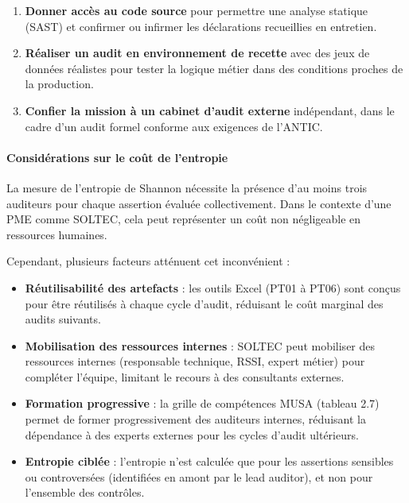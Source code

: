 \documentclass[12pt,a4paper,oneside]{report}
\begin{document}
\begin{enumerate}[label={\color{gold}\theenumi.}, leftmargin=*]
	\item \textbf{Donner accès au code source} pour permettre une 
	analyse statique (SAST) et confirmer ou infirmer les déclarations 
	recueillies en entretien.
	
	\item \textbf{Réaliser un audit en environnement de recette} 
	avec des jeux de données réalistes pour tester la logique métier 
	dans des conditions proches de la production.
	
	\item \textbf{Confier la mission à un cabinet d'audit externe} 
	indépendant, dans le cadre d'un audit formel conforme aux exigences 
	de l'ANTIC.
\end{enumerate}
\paragraph{Considérations sur le coût de l'entropie}

La mesure de l'entropie de Shannon nécessite la présence d'au moins 
trois auditeurs pour chaque assertion évaluée collectivement. Dans 
le contexte d'une PME comme SOLTEC, cela peut représenter un coût 
non négligeable en ressources humaines.

Cependant, plusieurs facteurs atténuent cet inconvénient :

\begin{itemize}[label={\color{gold}}, leftmargin=*, itemsep=2pt]
	\item \textbf{Réutilisabilité des artefacts} : les outils Excel 
	(PT01 à PT06) sont conçus pour être réutilisés à chaque cycle 
	d'audit, réduisant le coût marginal des audits suivants.
	
	\item \textbf{Mobilisation des ressources internes} : SOLTEC 
	peut mobiliser des ressources internes (responsable technique, 
	RSSI, expert métier) pour compléter l'équipe, limitant le 
	recours à des consultants externes.
	
	\item \textbf{Formation progressive} : la grille de compétences 
	MUSA (tableau 2.7) permet de former progressivement des auditeurs 
	internes, réduisant la dépendance à des experts externes pour 
	les cycles d'audit ultérieurs.
	
	\item \textbf{Entropie ciblée} : l'entropie n'est calculée que 
	pour les assertions sensibles ou controversées (identifiées en 
	amont par le lead auditor), et non pour l'ensemble des contrôles.
\end{itemize}
\end{document}
